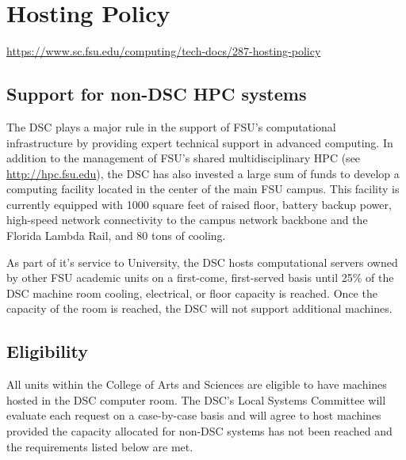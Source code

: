 \documentclass[12pt,a4paper]{article}
\begin{document}
\section{Hosting Policy}
\url{https://www.sc.fsu.edu/computing/tech-docs/287-hosting-policy}

\subsection*{Support for non-DSC HPC systems}
The DSC plays a major rule in the support of FSU's computational infrastructure by providing expert technical support in advanced computing. In addition to the management of FSU's shared multidisciplinary HPC (see \url{http://hpc.fsu.edu}), the DSC has also invested a large sum of funds to develop a computing facility located in the center of the main FSU campus. This facility is currently equipped with 1000 square feet of raised floor, battery backup power, high-speed network connectivity to the campus network backbone and the Florida Lambda Rail, and 80 tons of cooling.

As part of it's service to University, the DSC hosts computational servers owned by other FSU academic units on a first-come, first-served basis until 25\% of the DSC machine room cooling, electrical, or floor capacity is reached. Once the capacity of the room is reached, the DSC will not support additional machines.

\subsection*{Eligibility}
All units within the College of Arts and Sciences are eligible to have machines hosted in the DSC computer room. The DSC's Local Systems Committee will evaluate each request on a case-by-case basis and will agree to host machines provided the capacity allocated for non-DSC systems has not been reached and the requirements listed below are met.
\end{document}
